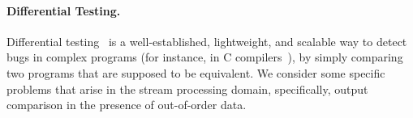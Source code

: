 \paragraph{Differential Testing.}
Differential testing~\cite{mckeeman1998differential,groce2007randomized} is a well-established, lightweight, and scalable way to detect bugs in complex programs (for instance, in C compilers~\cite{yang2011finding}), by simply comparing two programs that are supposed to be equivalent.  We consider some specific problems that arise in the stream processing domain, specifically, output comparison in the presence of out-of-order data.



